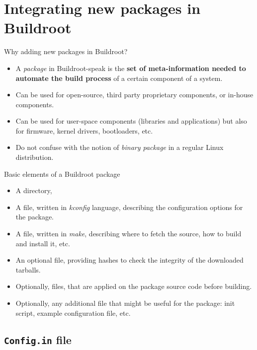 
\section{Integrating new packages in Buildroot}

\begin{frame}{Why adding new packages in Buildroot?}
  \begin{itemize}
  \item A {\em package} in Buildroot-speak is the {\bf set of
      meta-information needed to automate the build process} of a
    certain component of a system.
  \item Can be used for open-source, third party proprietary
    components, or in-house components.
  \item Can be used for user-space components (libraries and
    applications) but also for firmware, kernel drivers, bootloaders,
    etc.
  \item Do not confuse with the notion of {\em binary package} in a
    regular Linux distribution.
  \end{itemize}
\end{frame}

\begin{frame}{Basic elements of a Buildroot package}
  \begin{itemize}
  \item A directory, 
  \item A  file, written in {\em kconfig} language,
    describing the configuration options for the package.
  \item A  file, written in {\em make}, describing where to
    fetch the source, how to build and install it, etc.
  \item An optional  file, providing hashes to check
    the integrity of the downloaded tarballs.
  \item Optionally,  files, that are applied on the
    package source code before building.
  \item Optionally, any additional file that might be useful for the
    package: init script, example configuration file, etc.
  \end{itemize}
\end{frame}

\subsection{{\tt Config.in} file}

